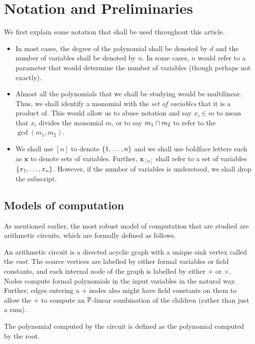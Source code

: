 \chapter{Notation and Preliminaries}\label{chap:notation}

We first explain some notation that shall be used throughout this article. 

\begin{itemize}
\item In most cases, the degree of the polynomial shall be denoted by $d$ and the number of variables shall be denoted by $n$. In some cases, $n$ would refer to a parameter that would determine the number of variables (though perhaps not exactly). 
\item Almost all the polynomials that we shall be studying would be multilinear. Thus, we shall identify a monomial with the \emph{set of variables} that it is a product of. This would allow us to abuse notation and say $x_i \in m$ to mean that $x_i$ divides the monomial $m$, or to say $m_1 \cap m_2$ to refer to the $\gcd(m_1,m_2)$. 
\item We shall use $[n]$ to denote $\left\{1,\dots, n\right\}$ and we shall use boldface letters such as $\mathbf{x}$ to denote sets of variables. Further, $\mathbf{x}_{[n]}$ shall refer to a set of variables $\left\{x_1,\dots, x_n\right\}$. However, if the number of variables is understood, we shall drop the subscript. 
\end{itemize}


\section{Models of computation}

As mentioned earlier, the most robust model of computation that are studied are arithmetic circuits, which are formally defined as follows. 

\begin{definition}\label{defn:arithmetic-circuit}
An arithmetic circuit is a directed acyclic graph with a unique sink vertex called the \emph{root}. The source vertices are labelled by either formal variables or field constants, and each internal node of the graph is labelled by either $+$ or $\times$. Nodes compute formal polynomials in the input variables  in the natural way. Further, edges entering a $+$ nodes also might have field constants on them to allow the $+$ to compute an $\mathbb{F}$-linear combination of the children (rather than just a sum). 

The polynomial computed by the circuit is defined as the polynomial computed by the root. 
\end{definition}

